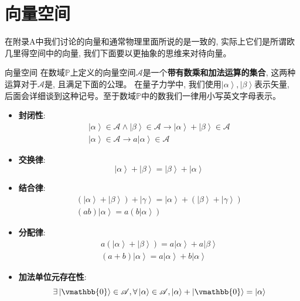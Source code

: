 \section{向量空间}
在附录A中我们讨论的向量和通常物理里面所说的是一致的, 实际上它们是所谓欧几里得空间中的向量, 我们下面要以更抽象的思维来对待向量。
\begin{define}{向量空间}
    在数域$\mathbb{P}$上定义的向量空间$\mathscr{A}$是一个\textbf{带有数乘和加法运算的集合}, 这两种运算对于$\mathscr{A}$是, 且满足下面的公理。
在量子力学中, 我们使用$\left| \alpha  \right\rangle ,\left| \beta  \right\rangle $表示矢量, 后面会详细谈到这种记号。至于数域$\mathbb{P}$中的数我们一律用小写英文字母表示。
\begin{itemize}
    \item \textbf{封闭性}:
        \[\begin{array}{l}
        \left| \alpha  \right\rangle  \in \mathscr{A} \wedge \left| \beta  \right\rangle  \in \mathscr{A} \to \left| \alpha  \right\rangle  + \left| \beta  \right\rangle  \in \mathscr{A}\\
        \left| \alpha  \right\rangle  \in \mathscr{A} \to a\left| \alpha  \right\rangle  \in \mathscr{A}
        \end{array}\]
    \item \textbf{交换律}:\[\left| \alpha  \right\rangle  + \left| \beta  \right\rangle  = \left| \beta  \right\rangle  + \left| \alpha  \right\rangle \]
    \item \textbf{结合律}:\[\begin{array}{l}
        \left( {\left| \alpha  \right\rangle  + \left| \beta  \right\rangle } \right) + \left| \gamma  \right\rangle  = \left| \alpha  \right\rangle  + \left( {\left| \beta  \right\rangle  + \left| \gamma  \right\rangle } \right)\\
        \left( {ab} \right)\left| \alpha  \right\rangle  = a\left( {b\left| \alpha  \right\rangle } \right)
        \end{array}\]
    \item \textbf{分配律}:\[\begin{array}{l}
        a\left( {\left| \alpha  \right\rangle  + \left| \beta  \right\rangle } \right) = a\left| \alpha  \right\rangle  + a\left| \beta  \right\rangle \\
        \left( {a + b} \right)\left| \alpha  \right\rangle  = a\left| \alpha  \right\rangle  + b\left| \alpha  \right\rangle 
        \end{array}\]
    \item \textbf{加法单位元存在性}:\[\exists \left| \vmathbb{0} \right\rangle  \in \mathscr{A},\forall \left| \alpha  \right\rangle  \in \mathscr{A},\left| \alpha  \right\rangle  + \left| \vmathbb{0} \right\rangle  = \left| \alpha  \right\rangle \]

\end{itemize}
\end{define}
